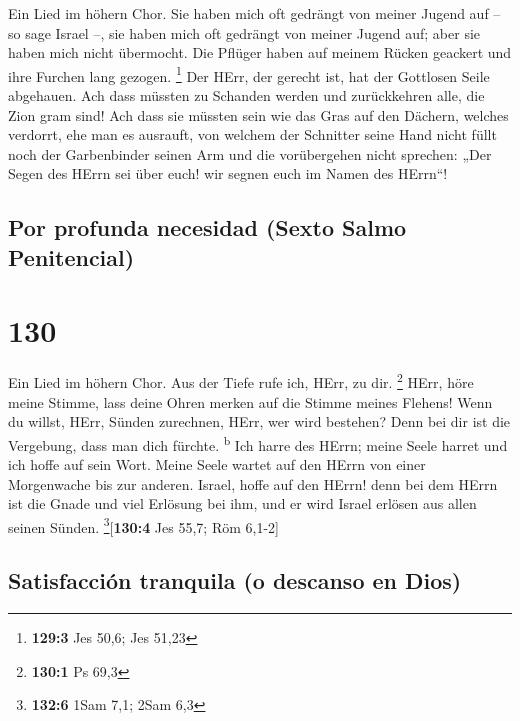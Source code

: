  Ein Lied im höhern Chor. Sie haben mich oft gedrängt von
meiner Jugend auf -- so sage Israel --,  sie haben mich
oft gedrängt von meiner Jugend auf; aber sie haben mich nicht übermocht.
 Die Pflüger haben auf meinem Rücken geackert und ihre
Furchen lang gezogen. \footnote{\textbf{129:3} Jes 50,6; Jes 51,23}
 Der HErr, der gerecht ist, hat der Gottlosen Seile
abgehauen.  Ach dass müssten zu Schanden werden und
zurückkehren alle, die Zion gram sind!  Ach dass sie
müssten sein wie das Gras auf den Dächern, welches verdorrt, ehe man es
ausrauft,  von welchem der Schnitter seine Hand nicht
füllt noch der Garbenbinder seinen Arm  und die
vorübergehen nicht sprechen: „Der Segen des HErrn sei über euch! wir
segnen euch im Namen des HErrn``!

\hypertarget{por-profunda-necesidad-sexto-salmo-penitencial}{%
\subsection{Por profunda necesidad (Sexto Salmo
Penitencial)}\label{por-profunda-necesidad-sexto-salmo-penitencial}}

\hypertarget{section-129}{%
\section{130}\label{section-129}}

 Ein Lied im höhern Chor. Aus der Tiefe rufe ich, HErr, zu
dir. \footnote{\textbf{130:1} Ps 69,3}  HErr, höre meine
Stimme, lass deine Ohren merken auf die Stimme meines Flehens!
 Wenn du willst, HErr, Sünden zurechnen, HErr, wer wird
bestehen?  Denn bei dir ist die Vergebung, dass man dich
fürchte. \textsuperscript{b}  Ich harre des HErrn; meine
Seele harret und ich hoffe auf sein Wort.  Meine Seele
wartet auf den HErrn von einer Morgenwache bis zur anderen.
 Israel, hoffe auf den HErrn! denn bei dem HErrn ist die
Gnade und viel Erlösung bei ihm,  und er wird Israel
erlösen aus allen seinen Sünden. \footnote{\textbf{132:6} 1Sam 7,1; 2Sam
  6,3}{[}\textbf{130:4} Jes 55,7; Röm 6,1-2{]}

\hypertarget{satisfacciuxf3n-tranquila-o-descanso-en-dios}{%
\subsection{Satisfacción tranquila (o descanso en
Dios)}\label{satisfacciuxf3n-tranquila-o-descanso-en-dios}}


